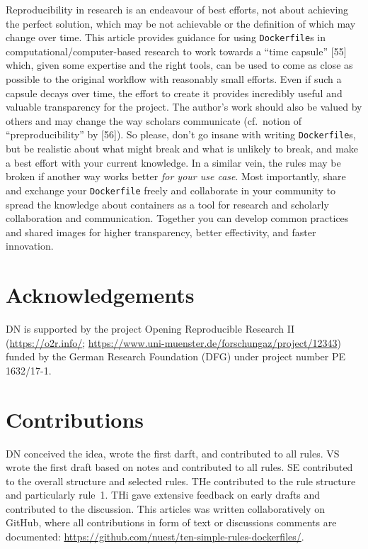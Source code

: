 \documentclass[10pt,letterpaper]{article}
\begin{document}
Reproducibility in research is an endeavour of best efforts, not about
achieving the perfect solution, which may be not achievable or the
definition of which may change over time. This article provides guidance
for using \texttt{Dockerfile}s in computational/computer-based research
to work towards a ``time capsule'' {[}55{]} which, given some expertise
and the right tools, can be used to come as close as possible to the
original workflow with reasonably small efforts. Even if such a capsule
decays over time, the effort to create it provides incredibly useful and
valuable transparency for the project. The author's work should also be
valued by others and may change the way scholars communicate (cf.~notion
of ``preproducibility'' by {[}56{]}). So please, don't go insane with
writing \texttt{Dockerfile}s, but be realistic about what might break
and what is unlikely to break, and make a best effort with your current
knowledge. In a similar vein, the rules may be broken if another way
works better \emph{for your use case}. Most importantly, share and
exchange your \texttt{Dockerfile} freely and collaborate in your
community to spread the knowledge about containers as a tool for
research and scholarly collaboration and communication. Together you can
develop common practices and shared images for higher transparency,
better effectivity, and faster innovation.

\hypertarget{acknowledgements}{%
\section*{Acknowledgements}\label{acknowledgements}}

DN is supported by the project Opening Reproducible Research II
(\href{https://o2r.info/}{https://o2r.info/};
\href{https://www.uni-muenster.de/forschungaz/project/12343}{https://www.uni-muenster.de/forschungaz/project/12343})
funded by the German Research Foundation (DFG) under project number PE
1632/17-1.

\hypertarget{contributions}{%
\section*{Contributions}\label{contributions}}

DN conceived the idea, wrote the first darft, and contributed to all
rules. VS wrote the first draft based on notes and contributed to all
rules. SE contributed to the overall structure and selected rules. THe
contributed to the rule structure and particularly rule~1. THi gave
extensive feedback on early drafts and contributed to the discussion.
This articles was written collaboratively on GitHub, where all
contributions in form of text or discussions comments are documented:
\url{https://github.com/nuest/ten-simple-rules-dockerfiles/}.
\end{document}
